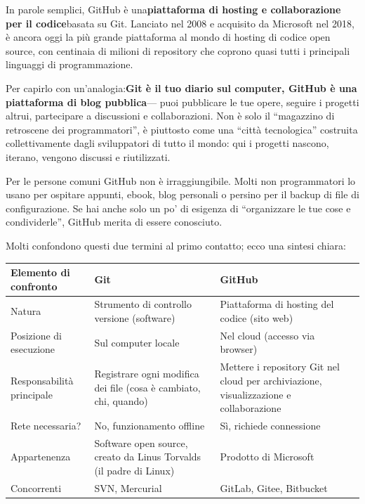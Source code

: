 


In parole semplici, GitHub è una\textbf{piattaforma di hosting e collaborazione per il codice}basata su Git. Lanciato nel 2008 e acquisito da Microsoft nel 2018, è ancora oggi la più grande piattaforma al mondo di hosting di codice open source, con centinaia di milioni di repository che coprono quasi tutti i principali linguaggi di programmazione.

Per capirlo con un'analogia:\textbf{Git è il tuo diario sul computer, GitHub è una piattaforma di blog pubblica}— puoi pubblicare le tue opere, seguire i progetti altrui, partecipare a discussioni e collaborazioni. Non è solo il “magazzino di retroscene dei programmatori”, è piuttosto come una “città tecnologica” costruita collettivamente dagli sviluppatori di tutto il mondo: qui i progetti nascono, iterano, vengono discussi e riutilizzati.

Per le persone comuni GitHub non è irraggiungibile. Molti non programmatori lo usano per ospitare appunti, ebook, blog personali o persino per il backup di file di configurazione. Se hai anche solo un po' di esigenza di “organizzare le tue cose e condividerle”, GitHub merita di essere conosciuto.


Molti confondono questi due termini al primo contatto; ecco una sintesi chiara:

\begin{center}
\begin{tabularx}{\linewidth}{|X|X|X|}
\hline
\textbf{Elemento di confronto} & \textbf{Git} & \textbf{GitHub} \tabularnewline
\hline
Natura & Strumento di controllo versione (software) & Piattaforma di hosting del codice (sito web) \tabularnewline
Posizione di esecuzione & Sul computer locale & Nel cloud (accesso via browser) \tabularnewline
Responsabilità principale & Registrare ogni modifica dei file (cosa è cambiato, chi, quando) & Mettere i repository Git nel cloud per archiviazione, visualizzazione e collaborazione \tabularnewline
Rete necessaria? & No, funzionamento offline & Sì, richiede connessione \tabularnewline
Appartenenza & Software open source, creato da Linus Torvalds (il padre di Linux) & Prodotto di Microsoft \tabularnewline
Concorrenti & SVN, Mercurial & GitLab, Gitee, Bitbucket \tabularnewline
\hline
\end{tabularx}
\end{center}

